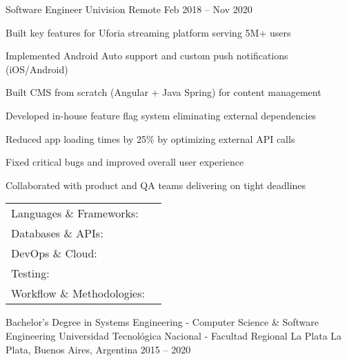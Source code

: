 \documentclass[]{awesome-cv}
\begin{document}
\begin{cventries}
	\cventry
	{Software Engineer}
	{Univision}
	{Remote}
	{Feb 2018 – Nov 2020}
	{\begin{cvitems}
		\item {Built key features for Uforia streaming platform serving 5M+ users}
		\item {Implemented Android Auto support and custom push notifications (iOS/Android)}
		\item {Built CMS from scratch (Angular + Java Spring) for content management}
		\item {Developed in-house feature flag system eliminating external dependencies}
		\item {Reduced app loading times by 25\% by optimizing external API calls}
		\item {Fixed critical bugs and improved overall user experience}
		\item {Collaborated with product and QA teams delivering on tight deadlines}
	\end{cvitems}}
\end{cventries}

\begin{cventries}
	\cventry
	{}
	{\def\arraystretch{1.15}{\begin{tabular}{ l l }
		Languages \& Frameworks:  & {\skill{ JavaScript, TypeScript, React, Next.js, Node.js, Express, HTML5, CSS3, Tailwind CSS, Rust}} \\
		Databases \& APIs:  & {\skill{ PostgreSQL, MongoDB, SQL, GraphQL, REST APIs}} \\
		DevOps \& Cloud:  & {\skill{ Docker, CI/CD, GitHub Actions, AWS, Google Cloud Platform (GCP), Linux, Git}} \\
		Testing:  & {\skill{ Jest, Cypress, Playwright, Unit Testing, Integration Testing, End-to-End Testing}} \\
		Workflow \& Methodologies:  & {\skill{ Agile, Scrum, Version Control, Code Review}} \\
		\end{tabular}}}
	{}
	{}
	{}
\end{cventries}

\vspace{-5mm}

\begin{cventries}
	\cventry
	{Bachelor's Degree in Systems Engineering - Computer Science \& Software Engineering}
	{Universidad Tecnológica Nacional - Facultad Regional La Plata}
	{La Plata, Buenos Aires, Argentina}
	{2015 – 2020}
	{}
\end{cventries}
\end{document}
